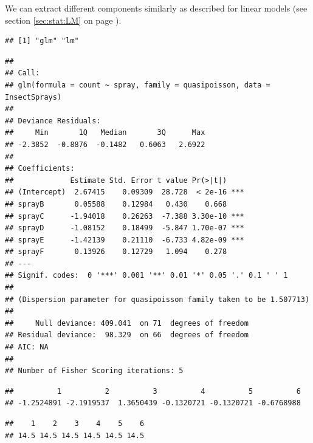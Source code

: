\documentclass[krantz2]{krantz}\usepackage{knitr}
\begin{document}
We can extract different components similarly as described for linear models (see section \ref{sec:stat:LM} on page \pageref{sec:stat:LM}).

\begin{knitrout}\footnotesize
{}\color{fgcolor}\begin{kframe}
\begin{alltt}
\end{alltt}
\begin{verbatim}
## [1] "glm" "lm"
\end{verbatim}
\begin{alltt}
\end{alltt}
\begin{verbatim}
## 
## Call:
## glm(formula = count ~ spray, family = quasipoisson, data = InsectSprays)
## 
## Deviance Residuals: 
##     Min       1Q   Median       3Q      Max  
## -2.3852  -0.8876  -0.1482   0.6063   2.6922  
## 
## Coefficients:
##             Estimate Std. Error t value Pr(>|t|)    
## (Intercept)  2.67415    0.09309  28.728  < 2e-16 ***
## sprayB       0.05588    0.12984   0.430    0.668    
## sprayC      -1.94018    0.26263  -7.388 3.30e-10 ***
## sprayD      -1.08152    0.18499  -5.847 1.70e-07 ***
## sprayE      -1.42139    0.21110  -6.733 4.82e-09 ***
## sprayF       0.13926    0.12729   1.094    0.278    
## ---
## Signif. codes:  0 '***' 0.001 '**' 0.01 '*' 0.05 '.' 0.1 ' ' 1
## 
## (Dispersion parameter for quasipoisson family taken to be 1.507713)
## 
##     Null deviance: 409.041  on 71  degrees of freedom
## Residual deviance:  98.329  on 66  degrees of freedom
## AIC: NA
## 
## Number of Fisher Scoring iterations: 5
\end{verbatim}
\begin{alltt}
\hlstd{(}
\end{alltt}
\begin{verbatim}
##          1          2          3          4          5          6 
## -1.2524891 -2.1919537  1.3650439 -0.1320721 -0.1320721 -0.6768988
\end{verbatim}
\begin{alltt}
\hlstd{(}
\end{alltt}
\begin{verbatim}
##    1    2    3    4    5    6 
## 14.5 14.5 14.5 14.5 14.5 14.5
\end{verbatim}
\end{kframe}
\end{knitrout}
\end{document}
